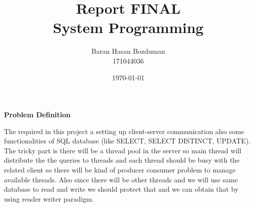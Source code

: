 \documentclass{report}
\title{\huge Report FINAL \\ \Huge System Programming}
\author{\huge Baran Hasan Bozduman\\ \huge 171044036}
\date{\today}
\begin{document}
\maketitle
{\huge \textbf{Problem Definition} \\}

{\large  The required in this project a setting up client-server communication also some functionalities of SQL database (like SELECT, SELECT DISTINCT, UPDATE). The tricky part is there will be a thread pool  in the server so main thread will distribute the the queries to threads and each thread should be busy with the related client so there will be kind of producer consumer problem to manage available threads. Also since there will be other threads and we will use same database to read and write we should protect that and we can obtain that by using reader writer paradigm.\\}
\end{document}

